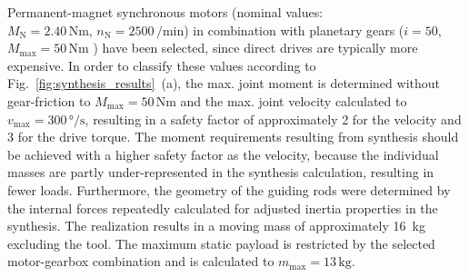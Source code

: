 \documentclass[runningheads]{llncs}
\begin{document}
Permanent-magnet synchronous motors (nominal values: $M_\text{N} = 2.40\,\si{\newton\metre},\, n_\text{N} = 2500 \,\si{\per\minute}$) in combination with planetary gears ($i=50$, $M_\text{max} = 50\,\si{\newton\metre}$ ) have been selected, since direct drives are typically more expensive.
In order to classify these values according to Fig.~\ref{fig:synthesis_results}~(a), the max. joint moment is determined without gear-friction to $M_\text{max} = 50\,\si{\newton\metre}$ and the max. joint velocity calculated to $v_\text{max} = 300\,\si{\degree\per\second}$, resulting in a safety factor of approximately 2 for the velocity and 3 for the drive torque.
The moment requirements resulting from synthesis should be achieved with a higher safety factor as the velocity, because the individual masses are partly under-represented in the synthesis calculation, resulting in fewer loads.
Furthermore, the geometry of the guiding rods were determined by the internal forces repeatedly calculated for adjusted inertia properties in the synthesis.
The realization results in a moving mass of approximately \SI{16}{\kilo\gram} excluding the tool.
The maximum static payload is restricted by the selected motor-gearbox combination and is calculated to $m_\text{max} = 13 \,\si{\kilo\gram}$.


\end{document}
